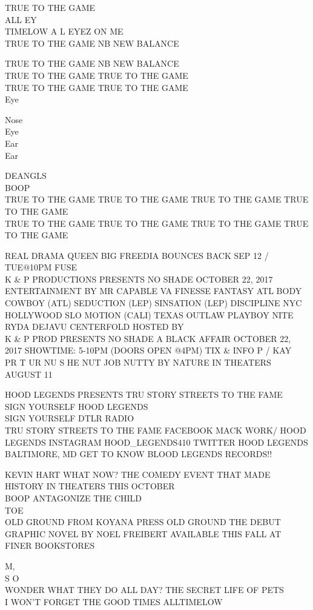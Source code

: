 \documentclass[10pt,letterpaper]{article}
\begin{document}
TRUE TO THE GAME\\
ALL EY\\
TIMELOW A L EYEZ ON ME\\
TRUE TO THE GAME NB NEW BALANCE

TRUE TO THE GAME NB NEW BALANCE\\
TRUE TO THE GAME TRUE TO THE GAME\\
TRUE TO THE GAME TRUE TO THE GAME\\
Eye

Nose\\
Eye\\
Ear\\
Ear

DEANGLS\\
BOOP\\
TRUE TO THE GAME TRUE TO THE GAME TRUE TO THE GAME TRUE TO THE GAME\\
TRUE TO THE GAME TRUE TO THE GAME TRUE TO THE GAME TRUE TO THE GAME

REAL DRAMA QUEEN BIG FREEDIA BOUNCES BACK SEP 12 / TUE@10PM FUSE\\
K \& P PRODUCTIONS PRESENTS NO SHADE OCTOBER 22, 2017 ENTERTAINMENT BY MR CAPABLE VA FINESSE FANTASY ATL BODY COWBOY (ATL) SEDUCTION (LEP) SINSATION (LEP) DISCIPLINE NYC HOLLYWOOD SLO MOTION (CALI) TEXAS OUTLAW PLAYBOY NITE RYDA DEJAVU CENTERFOLD HOSTED BY\\
K \& P PROD PRESENTS NO SHADE A BLACK AFFAIR OCTOBER 22, 2017 SHOWTIME: 5{-}10PM (DOORS OPEN @4PM) TIX \& INFO P / KAY\\
PR T UR NU S HE NUT JOB NUTTY BY NATURE IN THEATERS AUGUST 11

HOOD LEGENDS PRESENTS TRU STORY STREETS TO THE FAME\\
SIGN YOURSELF HOOD LEGENDS\\
SIGN YOURSELF DTLR RADIO\\
TRU STORY STREETS TO THE FAME FACEBOOK MACK WORK/ HOOD LEGENDS INSTAGRAM HOOD\_LEGENDS410 TWITTER HOOD LEGENDS BALTIMORE, MD GET TO KNOW BLOOD LEGENDS RECORDS!!

KEVIN HART WHAT NOW?  THE COMEDY EVENT THAT MADE HISTORY IN THEATERS THIS OCTOBER\\
BOOP ANTAGONIZE THE CHILD\\
TOE\\
OLD GROUND FROM KOYANA PRESS OLD GROUND THE DEBUT GRAPHIC NOVEL BY NOEL FREIBERT AVAILABLE THIS FALL AT FINER BOOKSTORES

M,\\
S O\\
WONDER WHAT THEY DO ALL DAY?  THE SECRET LIFE OF PETS\\
I WON'T FORGET THE GOOD TIMES ALLTIMELOW
\end{document}
